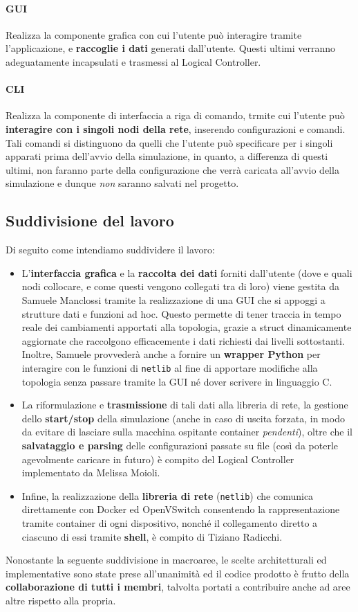 \paragraph*{GUI} Realizza la componente grafica con cui l'utente può interagire tramite l'applicazione, e \textbf{raccoglie i dati} generati dall'utente. Questi ultimi verranno adeguatamente incapsulati e trasmessi al Logical Controller.

\paragraph*{CLI} Realizza la componente di interfaccia a riga di comando, trmite cui l'utente può \textbf{interagire con i singoli nodi della rete}, inserendo configurazioni e comandi. Tali comandi si distinguono da quelli che l'utente può specificare per i singoli apparati prima dell'avvio della simulazione, in quanto, a differenza di questi ultimi, non faranno parte della configurazione che verrà caricata all'avvio della simulazione e dunque \textit{non} saranno salvati nel progetto.
\subsection{Suddivisione del lavoro}
Di seguito come intendiamo suddividere il lavoro:
\begin{itemize}
    \item L'\textbf{interfaccia grafica} e la \textbf{raccolta dei dati} forniti dall'utente (dove e quali nodi collocare, e come questi vengono collegati tra di loro) viene gestita da Samuele Manclossi tramite la realizzazione di una GUI che si appoggi a strutture dati e funzioni ad hoc. Questo permette di tener traccia in tempo reale dei cambiamenti apportati alla topologia, grazie a struct dinamicamente aggiornate che raccolgono efficacemente i dati richiesti dai livelli sottostanti. Inoltre, Samuele provvederà anche a fornire un \textbf{wrapper Python} per interagire con le funzioni di \texttt{netlib} al fine di apportare modifiche alla topologia senza passare tramite la GUI né dover scrivere in linguaggio C.
    \item La riformulazione e \textbf{trasmissione} di tali dati alla libreria di rete, la gestione dello \textbf{start/stop} della simulazione (anche in caso di uscita forzata, in modo da evitare di lasciare sulla macchina ospitante container \textsl{pendenti}), oltre che il \textbf{salvataggio e parsing} delle configurazioni passate su file (così da poterle agevolmente caricare in futuro) è compito del Logical Controller implementato da Melissa Moioli.
    \item Infine, la realizzazione della \textbf{libreria di rete} (\texttt{netlib}) che comunica direttamente con Docker ed OpenVSwitch consentendo la rappresentazione tramite container di ogni dispositivo, nonché il collegamento diretto a ciascuno di essi tramite \textbf{shell}, è compito di Tiziano Radicchi.
\end{itemize}
Nonostante la seguente suddivisione in macroaree, le scelte architetturali ed implementative sono state prese all'unanimità ed il codice prodotto è frutto della \textbf{collaborazione di tutti i membri}, talvolta portati a contribuire anche ad aree altre rispetto alla propria.


\newpage